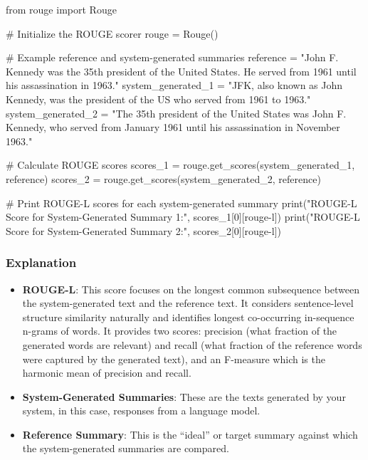 \documentclass[
]{agujournal2019}
\newenvironment{Shaded}{\begin{snugshade}}{\end{snugshade}}
\newcommand{\BuiltInTok}[1]{\textcolor[rgb]{0.00,0.23,0.31}{#1}}
\newcommand{\CommentTok}[1]{\textcolor[rgb]{0.37,0.37,0.37}{#1}}
\newcommand{\DecValTok}[1]{\textcolor[rgb]{0.68,0.00,0.00}{#1}}
\newcommand{\ImportTok}[1]{\textcolor[rgb]{0.00,0.46,0.62}{#1}}
\newcommand{\NormalTok}[1]{\textcolor[rgb]{0.00,0.23,0.31}{#1}}
\newcommand{\OperatorTok}[1]{\textcolor[rgb]{0.37,0.37,0.37}{#1}}
\newcommand{\StringTok}[1]{\textcolor[rgb]{0.13,0.47,0.30}{#1}}
\begin{document}
\begin{Shaded}
\begin{Highlighting}[]
\ImportTok{from}\NormalTok{ rouge }\ImportTok{import}\NormalTok{ Rouge}

\CommentTok{\# Initialize the ROUGE scorer}
\NormalTok{rouge }\OperatorTok{=}\NormalTok{ Rouge()}

\CommentTok{\# Example reference and system{-}generated summaries}
\NormalTok{reference }\OperatorTok{=} \StringTok{"John F. Kennedy was the 35th president of the United States. He served from 1961 until his assassination in 1963."}
\NormalTok{system\_generated\_1 }\OperatorTok{=} \StringTok{"JFK, also known as John Kennedy, was the president of the US who served from 1961 to 1963."}
\NormalTok{system\_generated\_2 }\OperatorTok{=} \StringTok{"The 35th president of the United States was John F. Kennedy, who served from January 1961 until his assassination in November 1963."}

\CommentTok{\# Calculate ROUGE scores}
\NormalTok{scores\_1 }\OperatorTok{=}\NormalTok{ rouge.get\_scores(system\_generated\_1, reference)}
\NormalTok{scores\_2 }\OperatorTok{=}\NormalTok{ rouge.get\_scores(system\_generated\_2, reference)}

\CommentTok{\# Print ROUGE{-}L scores for each system{-}generated summary}
\BuiltInTok{print}\NormalTok{(}\StringTok{"ROUGE{-}L Score for System{-}Generated Summary 1:"}\NormalTok{, scores\_1[}\DecValTok{0}\NormalTok{][}\StringTok{\textquotesingle{}rouge{-}l\textquotesingle{}}\NormalTok{])}
\BuiltInTok{print}\NormalTok{(}\StringTok{"ROUGE{-}L Score for System{-}Generated Summary 2:"}\NormalTok{, scores\_2[}\DecValTok{0}\NormalTok{][}\StringTok{\textquotesingle{}rouge{-}l\textquotesingle{}}\NormalTok{])}
\end{Highlighting}
\end{Shaded}

\subsubsection{Explanation}\label{explanation}

\begin{itemize}
\item
  \textbf{ROUGE-L}: This score focuses on the longest common subsequence
  between the system-generated text and the reference text. It considers
  sentence-level structure similarity naturally and identifies longest
  co-occurring in-sequence n-grams of words. It provides two scores:
  precision (what fraction of the generated words are relevant) and
  recall (what fraction of the reference words were captured by the
  generated text), and an F-measure which is the harmonic mean of
  precision and recall.
\item
  \textbf{System-Generated Summaries}: These are the texts generated by
  your system, in this case, responses from a language model.
\item
  \textbf{Reference Summary}: This is the ``ideal'' or target summary
  against which the system-generated summaries are compared.
\end{itemize}
\end{document}
